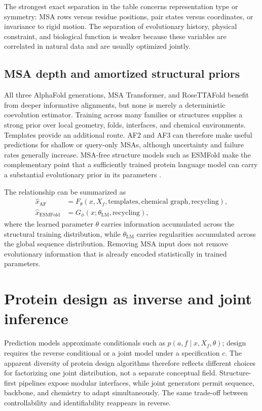 \documentclass[10pt]{article}
\begin{document}
The strongest exact separation in the table concerns representation type or symmetry: MSA rows
versus residue positions, pair states versus coordinates, or invariance to rigid motion.  The
separation of evolutionary history, physical constraint, and biological function is weaker because
these variables are correlated in natural data and are usually optimized jointly.

\subsection{MSA depth and amortized structural priors}

All three AlphaFold generations, MSA Transformer, and RoseTTAFold benefit from deeper informative
alignments, but none is merely a deterministic coevolution estimator.  Training across many
families or structures supplies a strong
prior over local geometry, folds, interfaces, and chemical environments.  Templates provide an
additional route.  AF2 and AF3 can therefore make useful predictions for shallow or query-only
MSAs, although uncertainty and failure rates generally increase.  MSA-free structure models such
as ESMFold make the complementary point that a sufficiently trained protein language model can
carry a substantial evolutionary prior in its parameters \cite{lin2023}.

The relationship can be summarized as
\begin{equation}
\begin{aligned}
\widehat x_{\mathrm{AF}}
&=F_{\theta}(x,X_f,\text{templates},\text{chemical graph},\text{recycling}),\\
\widehat x_{\mathrm{ESMFold}}
&=G_{\phi}\!\left(x;\theta_{\mathrm{LM}},\text{recycling}\right),
\end{aligned}
\end{equation}
where the learned parameter $\theta$ carries information accumulated across the structural
training distribution, while $\theta_{\mathrm{LM}}$ carries regularities accumulated across the
global sequence distribution.  Removing MSA input does not remove evolutionary information that
is already encoded statistically in trained parameters.

\section{Protein design as inverse and joint inference}

Prediction models approximate conditionals such as $p(a,f\mid x,X_f,\theta)$; design requires the
reverse conditional or a joint model under a specification $c$.  The apparent diversity of protein
design algorithms therefore reflects different choices for factorizing one joint distribution, not
a separate conceptual field.  Structure-first pipelines expose modular interfaces, while joint
generators permit sequence, backbone, and chemistry to adapt simultaneously.  The same trade-off
between controllability and identifiability reappears in reverse.
\end{document}
